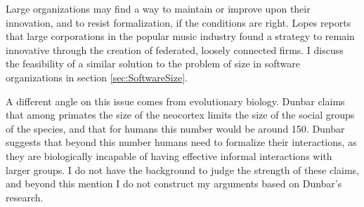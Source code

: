 Large organizations may find a way to maintain or improve upon their innovation, and to resist formalization, if the conditions are right. Lopes  reports that large corporations in the popular music industry found a strategy to remain innovative through the creation of federated, loosely connected firms. I discuss the feasibility of a similar solution to the problem of size in software organizations in section \ref{sec:SoftwareSize}.

A different angle on this issue comes from evolutionary biology. Dunbar  claims that among primates the size of the neocortex limits the size of the social groups of the species, and that for humans this number would be around 150. Dunbar suggests that beyond this number humans need to formalize their interactions, as they are biologically incapable of having effective informal interactions with larger groups. I do not have the background to judge the strength of these claims, and beyond this mention I do not construct my arguments based on Dunbar's research.
